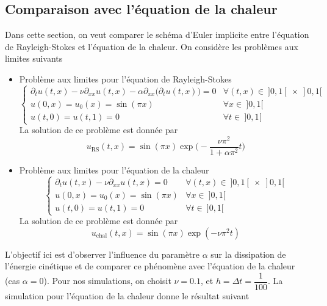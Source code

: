 \subsection{Comparaison avec l'équation de la chaleur}
Dans cette section, on veut comparer le schéma d'Euler implicite entre l'équation de Rayleigh-Stokes et l'équation de la chaleur. On considère les problèmes aux limites suivants
\begin{itemize}
    \item Problème aux limites pour l'équation de Rayleigh-Stokes
    \begin{equation*}
        \begin{cases}
            \partial_tu(t,x) - \nu\partial_{xx} u(t,x) - \alpha\partial_{xx} \big(\partial_t u(t,x)\big) = 0 & \forall (t,x) \in \ ]0, 1[ \ \times \ ]0,1[  \\
            u(0,x) = u_0(x) = \sin{(\pi x)} & \forall x \in \ ]0,1[ \\
            u(t, 0) = u(t,1) = 0 & \forall t \in \ ]0,1[
        \end{cases}
    \end{equation*}
    La solution de ce problème est donnée par 
    \begin{equation}\label{compRSchaleur_solRS}
        u_{\text{RS}}(t,x) = \sin{(\pi x)}\exp{\Big( -\frac{\nu \pi^2}{1+\alpha \pi^2}t\Big)}
    \end{equation}
    \item Problème aux limites pour l'équation de la chaleur
    \begin{equation*}
        \begin{cases}
            \partial_tu(t,x) - \nu\partial_{xx} u(t,x) = 0 & \forall (t,x) \in \ ]0,1[ \ \times \ ]0,1[  \\
            u(0,x) = u_0(x)=\sin{(\pi x)} & \forall x \in \ ]0,1[ \\
            u(t, 0) = u(t,1) = 0 & \forall t \in \ ]0,1[
        \end{cases}
    \end{equation*}
    La solution de ce problème est donnée par 
    \begin{equation}\label{compRSchaleur_solchaleur}
        u_{\text{chal}}(t,x) = \sin{(\pi x)}\exp{(-\nu \pi^2t)}
    \end{equation}
\end{itemize}
L'objectif ici est d'observer l'influence du paramètre $\alpha$ sur la dissipation de l'énergie cinétique et de comparer ce phénomène avec l'équation de la chaleur (cas $\alpha=0$). Pour nos simulations, on choisit $\nu = 0.1$, et $h=\Delta t = \dfrac{1}{100}$. La simulation pour l'équation de la chaleur donne le résultat suivant
